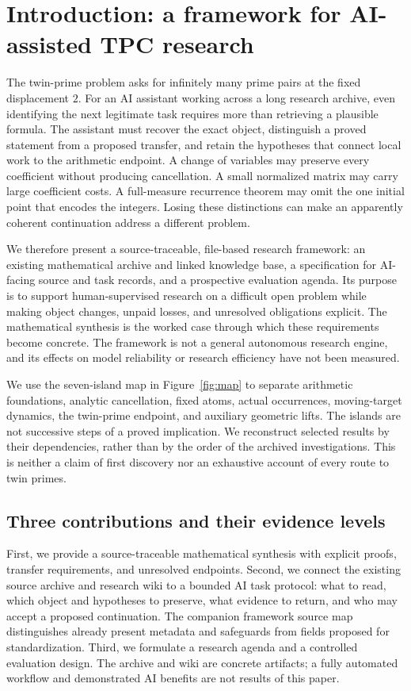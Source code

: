 \section{Introduction: a framework for AI-assisted TPC research}
The twin-prime problem asks for infinitely many prime pairs at the fixed displacement $2$. For an AI assistant working across a long research archive, even identifying the next legitimate task requires more than retrieving a plausible formula. The assistant must recover the exact object, distinguish a proved statement from a proposed transfer, and retain the hypotheses that connect local work to the arithmetic endpoint. A change of variables may preserve every coefficient without producing cancellation. A small normalized matrix may carry large coefficient costs. A full-measure recurrence theorem may omit the one initial point that encodes the integers. Losing these distinctions can make an apparently coherent continuation address a different problem.

We therefore present a source-traceable, file-based research framework: an existing mathematical archive and linked knowledge base, a specification for AI-facing source and task records, and a prospective evaluation agenda. Its purpose is to support human-supervised research on a difficult open problem while making object changes, unpaid losses, and unresolved obligations explicit. The mathematical synthesis is the worked case through which these requirements become concrete. The framework is not a general autonomous research engine, and its effects on model reliability or research efficiency have not been measured.

We use the seven-island map in Figure~\ref{fig:map} to separate arithmetic foundations, analytic cancellation, fixed atoms, actual occurrences, moving-target dynamics, the twin-prime endpoint, and auxiliary geometric lifts. The islands are not successive steps of a proved implication. We reconstruct selected results by their dependencies, rather than by the order of the archived investigations. This is neither a claim of first discovery nor an exhaustive account of every route to twin primes.

\subsection{Three contributions and their evidence levels}
First, we provide a source-traceable mathematical synthesis with explicit proofs, transfer requirements, and unresolved endpoints. Second, we connect the existing source archive and research wiki to a bounded AI task protocol: what to read, which object and hypotheses to preserve, what evidence to return, and who may accept a proposed continuation. The companion framework source map distinguishes already present metadata and safeguards from fields proposed for standardization. Third, we formulate a research agenda and a controlled evaluation design. The archive and wiki are concrete artifacts; a fully automated workflow and demonstrated AI benefits are not results of this paper.


